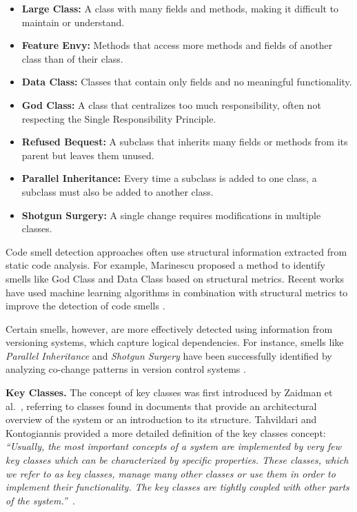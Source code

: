 \begin{itemize}
    \item \textbf{Large Class:} A class with many fields and methods, making it difficult to maintain or understand.
    \item \textbf{Feature Envy:} Methods that access more methods and fields of another class than of their class.
    \item \textbf{Data Class:} Classes that contain only fields and no meaningful functionality.
    \item \textbf{God Class:} A class that centralizes too much responsibility, often not respecting the Single Responsibility Principle.
    \item \textbf{Refused Bequest:} A subclass that inherits many fields or methods from its parent but leaves them unused.
    \item \textbf{Parallel Inheritance:} Every time a subclass is added to one class, a subclass must also be added to another class.
    \item \textbf{Shotgun Surgery:} A single change requires modifications in multiple classes.
\end{itemize}

Code smell detection approaches often use structural information extracted from static code analysis. For example, Marinescu \cite{Marinescu} proposed a method to identify smells like God Class and Data Class based on structural metrics. Recent works have used machine learning algorithms in combination with structural metrics to improve the detection of code smells \cite{code-smell-ml, PALOMBA20181}.

Certain smells, however, are more effectively detected using information from versioning systems, which capture logical dependencies. For instance, smells like \textit{Parallel Inheritance} and \textit{Shotgun Surgery} have been successfully identified by analyzing co-change patterns in version control systems \cite{6963448}.


\textbf{Key Classes.} The concept of key classes was first introduced by Zaidman et al.\ \cite{ZaidmanJurnal}, referring to classes found in documents that provide an architectural overview of the system or an introduction to its structure. Tahvildari and Kontogiannis provided a more detailed definition of the key classes concept: \textit{“Usually, the most important concepts of a system are implemented by very few key classes which can be characterized by specific properties. These classes, which we refer to as key classes, manage many other classes or use them in order to implement their functionality. The key classes are tightly coupled with other parts of the system.”}~\cite{Tahvildari2004ImprovingDQ}.

